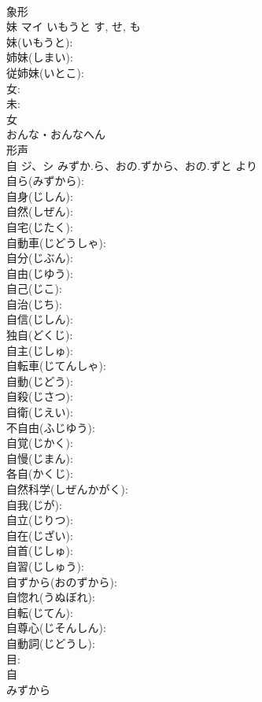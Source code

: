 \documentclass[8pt]{extreport}
\begin{document}
\begin{CJK}{UTF8}{min}
\\	象形 
\\	妹	マイ	いもうと	す, せ, も	
\\	妹(いもうと): 
\\	姉妹(しまい): 
\\	従姉妹(いとこ): 
\\	女: 
\\	未: 
\\	女	
\\	おんな・おんなへん	
\\	形声 
\\	自	ジ、シ	みずか.ら、おの.ずから、おの.ずと	より	
\\	自ら(みずから): 
\\	自身(じしん): 
\\	自然(しぜん): 
\\	自宅(じたく): 
\\	自動車(じどうしゃ): 
\\	自分(じぶん): 
\\	自由(じゆう): 
\\	自己(じこ): 
\\	自治(じち): 
\\	自信(じしん): 
\\	独自(どくじ): 
\\	自主(じしゅ): 
\\	自転車(じてんしゃ): 
\\	自動(じどう): 
\\	自殺(じさつ): 
\\	自衛(じえい): 
\\	不自由(ふじゆう): 
\\	自覚(じかく): 
\\	自慢(じまん): 
\\	各自(かくじ): 
\\	自然科学(しぜんかがく): 
\\	自我(じが): 
\\	自立(じりつ): 
\\	自在(じざい): 
\\	自首(じしゅ): 
\\	自習(じしゅう): 
\\	自ずから(おのずから): 
\\	自惚れ(うぬぼれ): 
\\	自転(じてん): 
\\	自尊心(じそんしん): 
\\	自動詞(じどうし): 
\\	目: 
\\	自	
\\	みずから	

\end{CJK}
\end{document}
